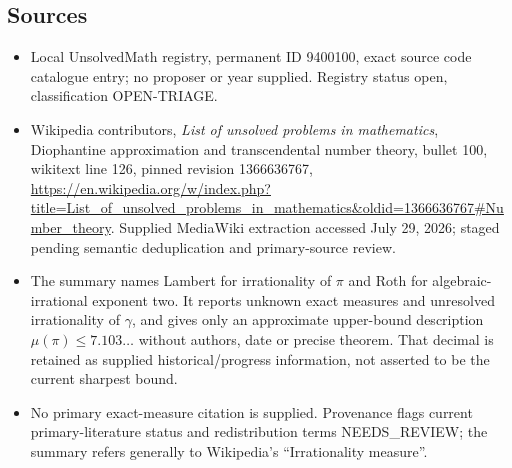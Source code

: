 \documentclass[11pt]{article}
\begin{document}
\subsection{Sources}
\begin{itemize}
\item Local UnsolvedMath registry, permanent ID 9400100, exact source code catalogue entry; no proposer or year supplied. Registry status open, classification OPEN-TRIAGE.
\item Wikipedia contributors, \emph{List of unsolved problems in mathematics}, Diophantine approximation and transcendental number theory, bullet 100, wikitext line 126, pinned revision 1366636767, \url{https://en.wikipedia.org/w/index.php?title=List_of_unsolved_problems_in_mathematics&oldid=1366636767#Number_theory}. Supplied MediaWiki extraction accessed July 29, 2026; staged pending semantic deduplication and primary-source review.
\item The summary names Lambert for irrationality of $\pi$ and Roth for algebraic-irrational exponent two. It reports unknown exact measures and unresolved irrationality of $\gamma$, and gives only an approximate upper-bound description $\mu(\pi)\leq7.103\ldots$ without authors, date or precise theorem. That decimal is retained as supplied historical/progress information, not asserted to be the current sharpest bound.
\item No primary exact-measure citation is supplied. Provenance flags current primary-literature status and redistribution terms NEEDS\_REVIEW; the summary refers generally to Wikipedia's ``Irrationality measure''.
\end{itemize}
\end{document}
